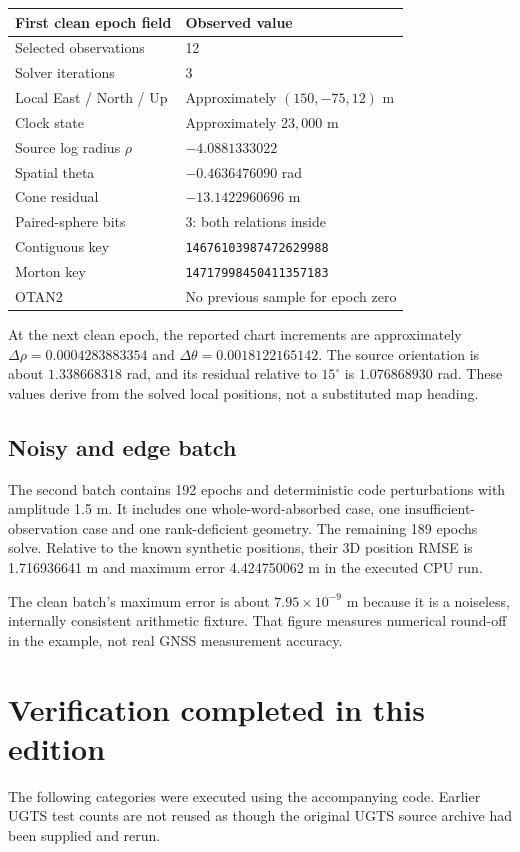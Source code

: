 \documentclass[11pt,a4paper]{article}
\newcommand{\code}[1]{\texttt{#1}}
\begin{document}
\begin{center}
\begin{tabularx}{\textwidth}{@{}P{.45\textwidth}Y@{}}\toprule
\textbf{First clean epoch field} & \textbf{Observed value}\\\midrule
Selected observations & 12\\
Solver iterations & 3\\
Local East / North / Up & Approximately $(150,-75,12)$ m\\
Clock state & Approximately $23{,}000$ m\\
Source log radius $\rho$ & $-4.0881333022$\\
Spatial theta & $-0.4636476090$ rad\\
Cone residual & $-13.1422960696$ m\\
Paired-sphere bits & 3: both relations inside\\
Contiguous key & \code{14676103987472629988}\\
Morton key & \code{14717998450411357183}\\
OTAN2 & No previous sample for epoch zero\\\bottomrule
\end{tabularx}
\end{center}

At the next clean epoch, the reported chart increments are approximately
$\Delta\rho=0.0004283883354$ and $\Delta\theta=0.0018122165142$.
The source orientation is about $1.338668318$ rad, and its residual relative to $15^\circ$ is
$1.076868930$ rad. These values derive from the solved local positions, not a substituted map heading.

\subsection{Noisy and edge batch}
The second batch contains 192 epochs and deterministic code perturbations with amplitude 1.5 m.
It includes one whole-word-absorbed case, one insufficient-observation case and one rank-deficient geometry.
The remaining 189 epochs solve. Relative to the known synthetic positions, their 3D position RMSE is
1.716936641 m and maximum error 4.424750062 m in the executed CPU run.

The clean batch's maximum error is about $7.95\times10^{-9}$ m because it is a noiseless, internally consistent
arithmetic fixture. That figure measures numerical round-off in the example, not real GNSS measurement accuracy.
\clearpage

\section{Verification completed in this edition}
The following categories were executed using the accompanying code. Earlier UGTS test counts are not
reused as though the original UGTS source archive had been supplied and rerun.
\end{document}
